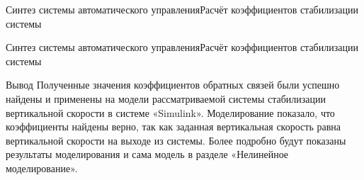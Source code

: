 \begin{frame}{Синтез системы автоматического управления}{Расчёт коэффициентов стабилизации системы}
    \begin{minipage}[c]{0.45\textwidth}
    \end{minipage}
    \begin{minipage}[c]{0.45\textwidth}
    \end{minipage}
\end{frame}

\begin{frame}{Синтез системы автоматического управления}{Расчёт коэффициентов стабилизации системы}
    \begin{block}{Вывод}
        Полученные значения коэффициентов обратных связей были успешно найдены и применены на модели рассматриваемой 
        системы стабилизации вертикальной скорости в системе «Simulink». Моделирование показало, что коэффициенты найдены верно, 
        так как заданная вертикальная скорость равна вертикальной скорости на выходе из системы. 
        Более подробно будут показаны результаты моделирования и сама модель в разделе «Нелинейное моделирование».
    \end{block}
\end{frame}

